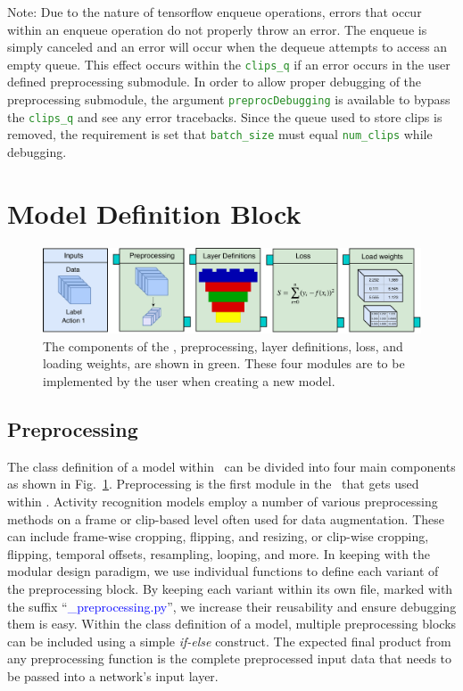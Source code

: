 \documentclass{llncs}
\begin{document}
Note: Due to the nature of tensorflow enqueue operations, errors that occur within an enqueue operation do not properly throw an error.
The enqueue is simply canceled and an error will occur when the dequeue attempts to access an empty queue.
This effect occurs within the \texttt{\textcolor{ForestGreen}{clips\_q}} if an error occurs in the user defined preprocessing submodule.
In order to allow proper debugging of the preprocessing submodule, the argument \texttt{\textcolor{ForestGreen}{preprocDebugging}} is available to bypass the \texttt{\textcolor{ForestGreen}{clips\_q}} and see any error tracebacks.
Since the queue used to store clips is removed, the requirement is set that \texttt{\textcolor{ForestGreen}{batch\_size}} must equal \texttt{\textcolor{ForestGreen}{num\_clips}} while debugging.



\section{Model Definition Block}
\label{sec:modeldefblock}

\begin{figure}[b!]
\centering
\includegraphics[width=\columnwidth]{images/model_submodule.pdf}
\caption{The components of the \modeldef, preprocessing, layer definitions, loss, and loading weights, are shown in green.
These four modules are to be implemented by the user when creating a new model. }
\label{fig:model_submodule}
\end{figure}


\subsection{Preprocessing}
The class definition of a model within \acro~can be divided into four main components as shown in Fig.~\ref{fig:model_submodule}.
Preprocessing is the first module in the \model~that gets used within \data.
Activity recognition models employ a number of various preprocessing methods on a frame or clip-based level often used for data augmentation.
These can include frame-wise cropping, flipping, and resizing, or clip-wise cropping, flipping, temporal offsets, resampling, looping, and more.
In keeping with the modular design paradigm, we use individual functions to define each variant of the preprocessing block.
By keeping each variant within its own file, marked with the suffix ``\textcolor{blue}{\_preprocessing.py}'', we increase their reusability and ensure debugging them is easy.
Within the class definition of a model, multiple preprocessing blocks can be included using a simple \textit{if-else} construct.
The expected final product from any preprocessing function is the complete preprocessed input data that needs to be passed into a network's input layer.
\end{document}
